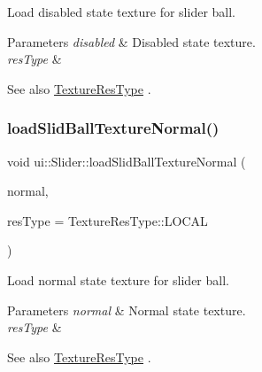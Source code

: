 Load disabled state texture for slider ball.


\begin{DoxyParams}{Parameters}
{\em disabled} & Disabled state texture. \\
\hline
{\em res\+Type} & \\
\hline
\end{DoxyParams}
\begin{DoxySeeAlso}{See also}
\hyperlink{classui_1_1Widget_a040a65ec5ad3b11119b7e16b98bd9af0}{Texture\+Res\+Type} . 
\end{DoxySeeAlso}
\mbox{\label{classui_1_1Slider_afa65628c541d567403116f5c8dd0f2e4}} 
\subsubsection{\texorpdfstring{load\+Slid\+Ball\+Texture\+Normal()}{loadSlidBallTextureNormal()}\hspace{0.1cm}{\footnotesize\ttfamily [1/2]}}
{\footnotesize\ttfamily void ui\+::\+Slider\+::load\+Slid\+Ball\+Texture\+Normal (\begin{DoxyParamCaption}\item[{const std\+::string \&}]{normal,  }\item[{\hyperlink{classui_1_1Widget_a040a65ec5ad3b11119b7e16b98bd9af0}{Texture\+Res\+Type}}]{res\+Type = {\ttfamily TextureResType\+:\+:LOCAL} }\end{DoxyParamCaption})}

Load normal state texture for slider ball.


\begin{DoxyParams}{Parameters}
{\em normal} & Normal state texture. \\
\hline
{\em res\+Type} & \\
\hline
\end{DoxyParams}
\begin{DoxySeeAlso}{See also}
\hyperlink{classui_1_1Widget_a040a65ec5ad3b11119b7e16b98bd9af0}{Texture\+Res\+Type} . 
\end{DoxySeeAlso}
\mbox{\label{classui_1_1Slider_afa65628c541d567403116f5c8dd0f2e4}} 
